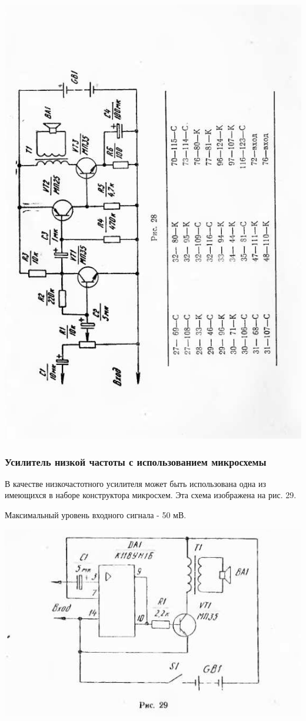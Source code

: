 \documentclass[12pt]{article}
\begin{document}
\includegraphics[width=\textwidth]{ekon3_025_1}

\newpage

\subsubsection{Усилитель низкой частоты с использованием микросхемы}

В качестве низкочастотного усилителя может быть использована одна из имеющихся в наборе конструктора микросхем. Эта схема изображена на рис. 29.

Максимальный уровень входного сигнала - 50 мВ.

\includegraphics[width=\textwidth]{ekon3_026_1}
\end{document}
